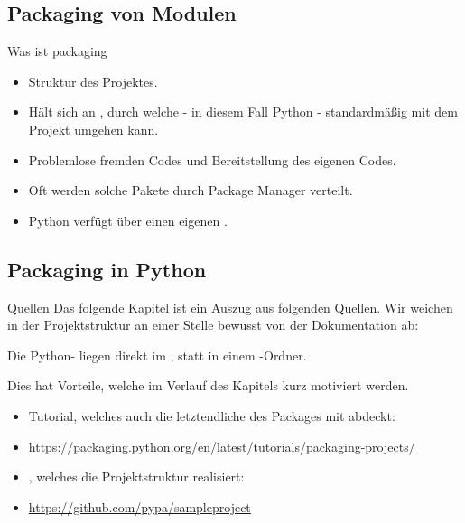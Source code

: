 \documentclass[12pt, aspectratio=169, usepdftitle=false]{beamer}
\newcommand{\pp}[1]{\lpl{#1}}
\begin{document}
\subsection{Packaging von Modulen}
\begin{frame}{Was ist packaging}
	\begin{itemize}
		\item {} Struktur des Projektes.
		\pause
		\item Hält sich an , durch welche - in diesem Fall Python - standardmäßig mit dem Projekt umgehen kann.
		\pause
		\item Problemlose  fremden Codes und Bereitstellung des eigenen Codes.
		\pause
		\item Oft werden solche Pakete durch Package Manager verteilt.
		\item[] Python verfügt über einen eigenen  \pp{pip}.
	\end{itemize}
	
\end{frame}

\subsection{Packaging in Python}

\begin{frame}{Quellen}
	Das folgende Kapitel ist ein Auszug aus folgenden Quellen. \newline
	\pause
	Wir weichen in der Projektstruktur an einer Stelle bewusst von der Dokumentation ab: 
	\pause
	
	\medskip
	
	Die Python- liegen direkt im , statt in einem \pp{src/}-Ordner.
	
	Dies hat Vorteile, welche im Verlauf des Kapitels kurz motiviert werden.
	
	\medskip
	\pause
	
	\begin{itemize}
		\item Tutorial, welches auch die letztendliche  des Packages mit abdeckt:
		\item[] \url{https://packaging.python.org/en/latest/tutorials/packaging-projects/}
		\item {}, welches die Projektstruktur realisiert:
		\item[] \url{https://github.com/pypa/sampleproject}
	\end{itemize}

\end{frame}
\end{document}
